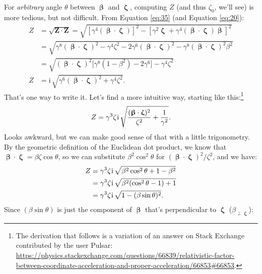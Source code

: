 \documentclass[12pt]{article}
\renewcommand{\vv}[1]{\mathbf{#1}}
\newcommand{\vvbeta}{\bm{\upbeta}}
\newcommand{\vvzeta}{\bm{\upzeta}}
\begin{document}
For \emph{arbitrary} angle $\theta$ between $\vvbeta$ and $\vvzeta$, computing $Z$ (and thus $\zeta_0$, we'll see) is more tedious, but not difficult. From Equation \ref{eq:35} (and Equation \ref{eq:20}):
\begin{equation}\label{eq:pa2}
\begin{split}
Z &= \sqrt{\vv Z \cdot \vv Z} = \sqrt{ \left[ \gamma^4 (\vvbeta \cdot \vvzeta) \right]^2 - \left[ \gamma^2 \vvzeta + \gamma^4 (\vvbeta \cdot \vvzeta) \vvbeta \right]^2}\\[2pt]
&= \sqrt{\gamma^8(\vvbeta \cdot \vvzeta)^2 - \gamma^4 \zeta^2 - 2\gamma^6 (\vvbeta \cdot \vvzeta)^2 - \gamma^8 (\vvbeta \cdot \vvzeta)^2 \beta^2 }\\[2pt]
&= \sqrt{(\vvbeta \cdot \vvzeta)^2 \Big[ \gamma^8 (1 - \beta^2) - 2\gamma^6 \Big] - \gamma^4 \zeta^2} \\[2pt]
Z &= \mathrm{i} \, \sqrt{\gamma^6 (\vvbeta \cdot \vvzeta)^2 + \gamma^4 \zeta^2} .
\end{split}
\end{equation}
That's one way to write it. Let's find a more intuitive way, starting like this:\footnote{The derivation that follows is a variation of an answer on Stack Exchange contributed by the user Pulsar: \url{https://physics.stackexchange.com/questions/66839/relativistic-factor-between-coordinate-acceleration-and-proper-acceleration/66853\#66853}.}
\begin{equation*}
Z = \gamma^3 \zeta \mkern1mu \mathrm{i} \, \sqrt{\frac{(\vvbeta \cdot \vvzeta)^2}{\zeta^2} + \frac{1}{\gamma^2}}.
\end{equation*}
Looks awkward, but we can make good sense of that with a little trigonometry. By the geometric definition of the Euclidean dot product, we know that $\vvbeta \cdot \vvzeta = \beta \zeta \cos{\theta}$, so we can substitute $\beta^2 \cos^2{\theta}$ for $(\vvbeta \cdot \vvzeta)^2 / \zeta^2$, and we have:
\begin{equation*}
\begin{split}
Z &= \gamma^3 \zeta \mkern1mu \mathrm{i} \, \sqrt{\beta^2 \cos^2{\theta} + 1 - \beta^2}\\
&= \gamma^3 \zeta \mkern1mu \mathrm{i} \, \sqrt{\beta^2 (\cos^2{\theta} - 1) + 1}\\
&= \gamma^3 \zeta \mkern1mu \mathrm{i} \, \sqrt{1 - (\beta \sin{\theta})^2}.
\end{split}
\end{equation*}
Since $(\beta \sin{\theta})$ is just the component of $\vvbeta$ that's perpendicular to $\vvzeta$ ($\beta_{\perp \vvzeta}$):
\end{document}
